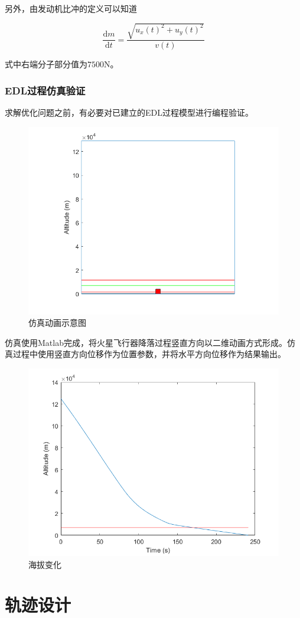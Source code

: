 \documentclass[UTF8,12pt]{ctexart}
\begin{document}
另外，由发动机比冲的定义可以知道

\begin{equation}
\frac{\mathrm{d}m}{\mathrm{d}t}=\frac{\sqrt{u_x(t)^2+u_y(t)^2}}{v(t)}
\end{equation}

式中右端分子部分值为$7500$N。

\subsubsection{EDL过程仿真验证}

求解优化问题之前，有必要对已建立的EDL过程模型进行编程验证。

\begin{figure}[htb]
	\centering
	\includegraphics[width=0.6\linewidth]{仿真动画.png}
	\caption{仿真动画示意图}
	\label{fig:pathdemo}	
\end{figure}

仿真使用Matlab完成，将火星飞行器降落过程竖直方向以二维动画方式形成。仿真过程中使用竖直方向位移作为位置参数，并将水平方向位移作为结果输出。

\begin{figure}[htb]
	\centering
	\includegraphics[width=0.6\linewidth]{海拔变化.png}
	\caption{海拔变化}
	\label{fig:pathdemo}	
\end{figure}

\section{轨迹设计}
\end{document}
